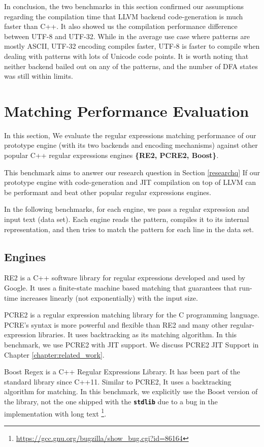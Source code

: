 In conclusion, the two benchmarks in this section confirmed our assumptions regarding the compilation time that LLVM backend code-generation is much faster than C++. It also showed us the compilation performance difference between UTF-8 and UTF-32. While in the average use case where patterns are mostly ASCII, UTF-32 encoding compiles faster, UTF-8 is faster to compile when dealing with patterns with lots of Unicode code points. It is worth noting that neither backend bailed out on any of the patterns, and the number of DFA states was still within limits.

\section{Matching Performance Evaluation}

In this section, We evaluate the regular expressions matching performance of our prototype engine (with its two backends and encoding mechanisms) against other popular C++ regular expressions engines \textbf{\{RE2, PCRE2, Boost\}}.

This benchmark aims to answer our research question in Section \ref{researchq} If our prototype engine with code-generation and JIT compilation on top of LLVM can be performant and beat other popular regular expressions engines.

In the following benchmarks, for each engine, we pass a regular expression and input text (data set). Each engine reads the pattern, compiles it to its internal representation, and then tries to match the pattern for each line in the data set.

\subsection{Engines}
RE2 \cite{re2} is a C++ software library for regular expressions developed and used by Google. It uses a finite-state machine based matching that guarantees that run-time increases linearly (not exponentially) with the input size.

PCRE2 \cite{pcre2} is a regular expression matching library for the C programming language. PCRE's syntax is more powerful and flexible than RE2 and many other regular-expression libraries. It uses backtracking as its matching algorithm. In this benchmark, we use PCRE2 with JIT support. We discuss PCRE2 JIT Support in Chapter \ref{chapter:related_work}.

Boost Regex \cite{Boost} is a C++ Regular Expressions Library. It has been part of the standard library since C++11. Similar to PCRE2, It uses a backtracking algorithm for matching. In this benchmark, we explicitly use the Boost version of the library, not the one shipped with the \texttt{\textbf{stdlib}} due to a bug in the implementation with long text \footnote{\url{https://gcc.gnu.org/bugzilla/show\_bug.cgi?id=86164}}.

